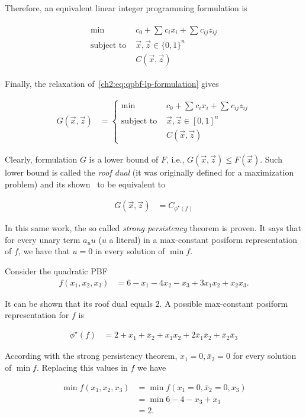 Therefore, an equivalent linear integer programming formulation is

\begin{align}
	\begin{array}{rl}
		\min& c_0 + \sum_{}{c_ix_i} + \sum_{}{c_{ij}z_{ij}} \\
		\text{subject to }&  \vec{x},\vec{z} \in \{0,1\}^n\\
		&C(\vec{x},\vec{z})	
	\end{array}
	\label{ch2:eq:qpbf-lp-formulation}
\end{align}

Finally, the relaxation of~\cref{ch2:eq:qpbf-lp-formulation} gives

\begin{align*}
	G(\vec{x},\vec{z}) &= \left\{ \begin{array}{rl}
		\min& c_0 + \sum_{}{c_ix_i} + \sum_{}{c_{ij}z_{ij}} \\
		\text{subject to }&  \vec{x},\vec{z} \in [0,1]^n\\
		&C(\vec{x},\vec{z})
	\end{array}\right.
\end{align*}

Clearly, formulation $G$ is a lower bound of $F$, i.e.,  $G(\vec{x},\vec{z}) \leq F(\vec{x})$. Such lower bound is called the \emph{roof dual} (it was originally defined for a maximization problem) and its shown~\cite{hammer84} to be equivalent to

\begin{align*}
	G(\vec{x},\vec{z}) &= C_{\phi^{\star}(f)}
\end{align*}

In this same work, the so called \emph{strong persistency} theorem is proven. It says that for every unary term $a_uu$ ($u$ a literal) in a max-constant posiform representation of $f$, we have that $u=0$ in every solution of $\min f$.

\begin{example}
Consider the quadratic PBF 
\begin{align*}
	f(x_1,x_2,x_3) &= 6-x_1-4x_2-x_3+3x_1x_2+x_2x_3.
\end{align*}

It can be shown that its roof dual equals $2$. A possible max-constant posiform representation for $f$ is

\begin{align*}
	\phi^{\star}(f) &= 2 + x_1 + \bar{x}_2 + x_1x_2 +2\bar{x}_1\bar{x}_2 + \bar{x}_2\bar{x}_3
\end{align*}

According with the strong persistency theorem, $x_1=0,\bar{x}_2=0$ for every solution of $\min f$. Replacing this values in $f$ we have

\begin{align*}
	\min f(x_1,x_2,x_3) &=\min f(x_1=0,\bar{x}_2=0,x_3) \\
	&= \min 6 - 4 - x_3 + x_3 \\
	&= 2.
\end{align*}
\end{example}

